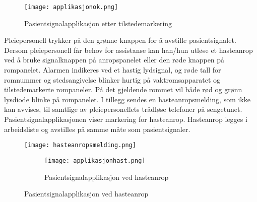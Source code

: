 \begin{figure}[H]
\centering
\texttt{[image: applikasjonok.png]}
\caption{Pasientsignalapplikasjon etter tilstedemarkering}
\label{applikasjonok}
\end{figure}

\noindent
Pleiepersonell trykker på den grønne knappen for å avstille pasientsignalet. Dersom pleiepersonell får behov for assistanse kan han/hun utløse et hasteanrop ved å bruke signalknappen på anropspanelet eller den røde knappen på rompanelet. Alarmen indikeres ved et hastig lydsignal, og røde tall for romnummer og stedsangivelse blinker hurtig på vaktromsapparatet og tilstedemarkerte rompaneler. På det gjeldende rommet vil både rød og grønn lysdiode blinke på rompanelet. I tillegg sendes en hasteanropsmelding, som ikke kan avvises, til samtlige av pleiepersonellets trådløse telefoner på sengetunet. Pasientsignalapplikasjonen viser markering for hasteanrop. Hasteanrop legges i arbeidsliste og avstilles på samme måte som pasientsignaler.

\begin{figure}[H]
\centering
\texttt{[image: hasteanropsmelding.png]}
\caption{Trådløs telefonenhet ved hasteanrop}

\begin{figure}[H]
\centering
\texttt{[image: applikasjonhast.png]}
\caption{Pasientsignalapplikasjon ved hasteanrop}
\label{applikasjonok}
\end{figure}
\label{applikasjonok}
\end{figure}











